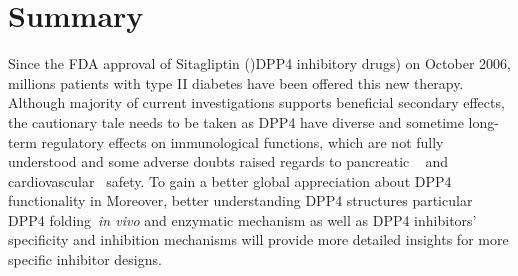 \section{\label{chap:Sum} Summary}
Since the FDA approval of Sitagliptin ()DPP4 inhibitory drugs) on October 2006, millions patients with type II diabetes have been offered this new therapy. Although majority of current investigations supports beneficial secondary effects, the cautionary tale needs to be taken as DPP4 have diverse and sometime long-term regulatory effects on immunological functions, which are not fully understood and some adverse doubts raised regards to pancreatic ~\cite{Egan2014, Jermendy2016} and cardiovascular~\cite{Scirica2013} safety. To gain a better global appreciation about DPP4 functionality in  Moreover, better understanding DPP4 structures particular DPP4 folding~\textit{in vivo} and enzymatic mechanism as well as DPP4 inhibitors' specificity and inhibition mechanisms will provide more detailed insights for more specific inhibitor designs. 
